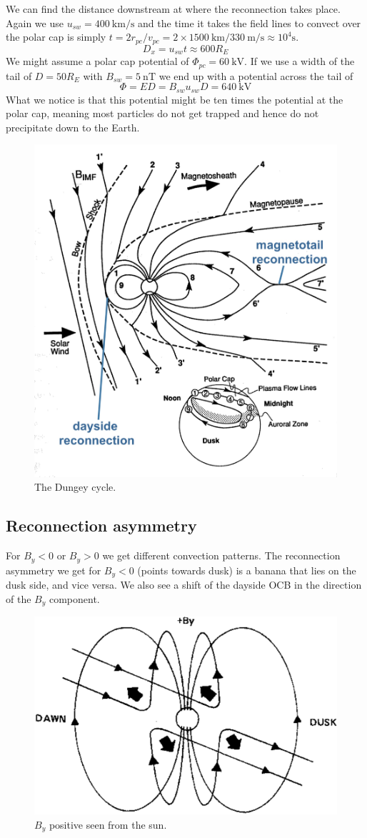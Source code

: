 We can find the distance downstream at where the reconnection takes place. Again we use \(u_{sw}=\SI{400}{\kilo\metre/\second}\) and the time it takes the field lines to convect over the polar cap is simply \(t=2r_{pc}/v_{pc}=2\times\SI{1500}{\kilo\metre}/\SI{330}{\metre/\second}\approx 10^4\si{\second}\).
\begin{equation*}
    D_x=u_{sw}t\approx 600R_E
\end{equation*}
We might assume a polar cap potential of \(\Phi_{pc}=\SI{60}{\kilo\volt}\). If we use a width of the tail of \(D=50R_E\) with \(B_{sw}=\SI{5}{\nano\tesla}\) we end up with a potential across the tail of
\begin{equation*}
    \Phi=ED=B_{sw}u_{sw}D=\SI{640}{\kilo\volt}
\end{equation*}
What we notice is that this potential might be ten times the potential at the polar cap, meaning most particles do not get trapped and hence do not precipitate down to the Earth.
\begin{figure}[t]
    \centering
    \includegraphics[width=.4\linewidth]{bilder/L8_dungey_cycle.jpg}
    \caption{The Dungey cycle.}\label{fig:L8_dungey_cycle}
\end{figure}

\subsection{Reconnection asymmetry}
For \(B_y<0\) or \(B_y>0\) we get different convection patterns. The reconnection asymmetry we get for \(B_y<0\) (points towards dusk) is a banana that lies on the dusk side, and vice versa. We also see a shift of the dayside OCB in the direction of the \(B_y\) component.
\begin{figure}[t]
    \centering
    \includegraphics[width=.4\linewidth]{bilder/L8_by_asymmetry.jpg}
    \caption{\(B_y\) positive seen from the sun.}\label{fig:L8_by_asymmetry}
\end{figure}

